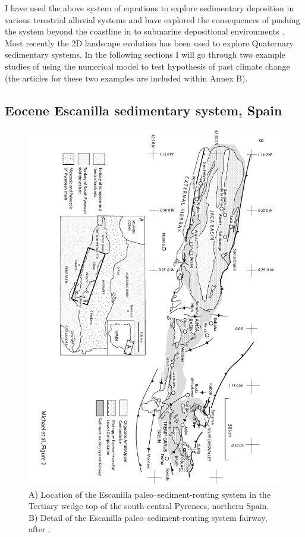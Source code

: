 I have used the above system of equations to explore sedimentary deposition in various terestrial alluvial systems and have explored the consequences of pushing the system beyond the coastline in to submarine depositional environments \citep{armitage-etal-ngeo-2011,armitage-etal-jsr-2015,armitage-etal-br-2018,duller-etal-2019}. Most recently the 2D landscape evolution has been used to explore Quaternary sedimentary systems. In the following sections I will go through two example studies of using the numerical model to test hypothesis of past climate change (the articles for these two examples are included within Annex B).

\subsection{Eocene Escanilla sedimentary system, Spain}

\begin{figure}
\includegraphics[height=\textwidth,angle=90]{./figures/ch2-escanilla-map.pdf}
\caption{A) Location of the Escanilla paleo--sediment-routing system in the Tertiary wedge top of the south-central Pyrenees, northern Spain. B) Detail of the Escanilla paleo--sediment-routing system fairway, after \cite{michael-etal-2014}.}
\label{fg:escanilla-map}
\end{figure}

